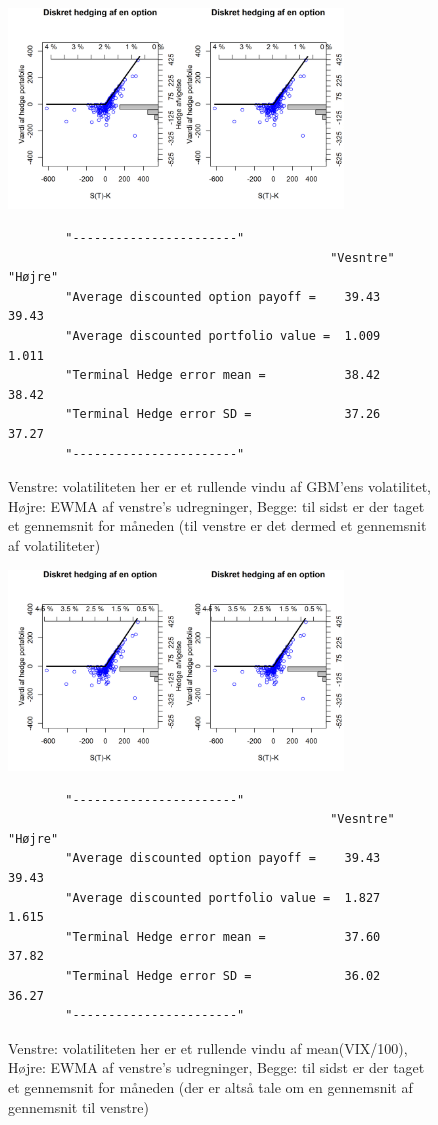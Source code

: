 \documentclass{article}
\theoremstyle{definition}
\theoremstyle{remark}
\begin{document}
\begin{figure}
    \centering
    \includegraphics[width=3.5in]{1 product_call_meanrolling_meanEMVA}
    \caption{Venstre: volatiliteten her er et rullende vindu af GBM'ens volatilitet, Højre: EWMA af venstre's udregninger, Begge: til sidst er der taget et gennemsnit for måneden (til venstre er det dermed et gennemsnit af volatiliteter)}
    \begin{verbatim}
        "-----------------------"                         
                                             "Vesntre"       "Højre"
        "Average discounted option payoff =    39.43          39.43
        "Average discounted portfolio value =  1.009          1.011
        "Terminal Hedge error mean =           38.42          38.42
        "Terminal Hedge error SD =             37.26          37.27
        "-----------------------"
    \end{verbatim}
    \label{fig:rullende}
\end{figure}
\begin{figure}
    \centering
    \includegraphics[width=3.5in]{2 product_call_meanrolling_meanEMVA}
    \caption{Venstre: volatiliteten her er et rullende vindu af mean(VIX/100), Højre: EWMA af venstre's udregninger, Begge: til sidst er der taget et gennemsnit for måneden (der er altså tale om en gennemsnit af gennemsnit til venstre)}
    \begin{verbatim}
        "-----------------------"                         
                                             "Vesntre"       "Højre"
        "Average discounted option payoff =    39.43          39.43
        "Average discounted portfolio value =  1.827          1.615
        "Terminal Hedge error mean =           37.60          37.82
        "Terminal Hedge error SD =             36.02          36.27
        "-----------------------"
    \end{verbatim}
    \label{fig:rullendeVIX}
\end{figure}
\end{document}
